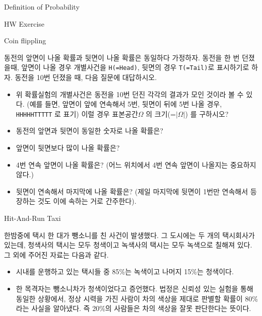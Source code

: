 \begin{edXchapter}{Definition of Probability}

\begin{edXsection}{HW Exercise}

\begin{edXvertical}

\begin{edXproblem}{Coin flippling}

동전의 앞면이 나올 확률과 뒷면이 나올 확률은 동일하다 가정하자. 동전을 한 번 던졌을때,
앞면이 나올 경우 개별사건을 {\tt H(=Head)}, 뒷면의 경우 {\tt T(=Tail)}로 표시하기로 하자.
동전을 10번 던졌을 때, 다음 질문에 대답하시오.


\begin{itemize}
\item 위 확률실험의 개별사건은 동전을 10번 던진 각각의 결과가 모인 것이라 볼 수 있다. 
(예를 들면, 앞면이 앞에 연속해서 5번, 뒷면이 뒤에 5번 나올 경우, {\tt HHHHHTTTTT} 로 표기) 
이럴 경우 표본공간$\Omega$ 의 크기(=$|\Omega|$) 를 구하시오?
\item 동전의 앞면과 뒷면이 동일한 숫자로 나올 확률은?
\item 앞면이 뒷면보다 많이 나올 확률은?
\item 4번 연속 앞면이 나올 확률은? (어느 위치에서 4번 연속 앞면이 나올지는 중요하지 않다.) 
\item 뒷면이 연속해서 마지막에 나올 확률은? (제일 마지막에 뒷면이 1번만 연속해서 등장하는 것도 이에 속하는 거로 간주한다).
\end{itemize}

\end{edXproblem}

\begin{edXproblem}{Hit-And-Run Taxi}

한밤중에 택시 한 대가 뺑소니를 친 사건이 발생했다. 그 도시에는 두 개의 택시회사가 있는데,
청색사의 택시는 모두 청색이고 녹색사의 택시는 모두 녹색으로 칠해져 있다. 그 외에 주어진 
자료는 다음과 같다.
\begin{itemize}
\item 시내를 운행하고 있는 택시들 중 85\%는 녹색이고 나머지 15\%는 청색이다.
\item 한 목격자는 뺑소니차가 청색이었다고 증언했다. 법정은 신뢰성 있는 실험을 통해 동일한 상황에서,
정상 시력을 가진 사람이 차의 색상을 제대로 판별할 확률이 80\%라는 사실을 알아냈다. 즉 20\%의
사람들은 차의 색상을 잘못 판단한다는 뜻이다.
\end{itemize}


\end{edXproblem}
\end{edXvertical}
\end{edXsection}
\end{edXchapter}
